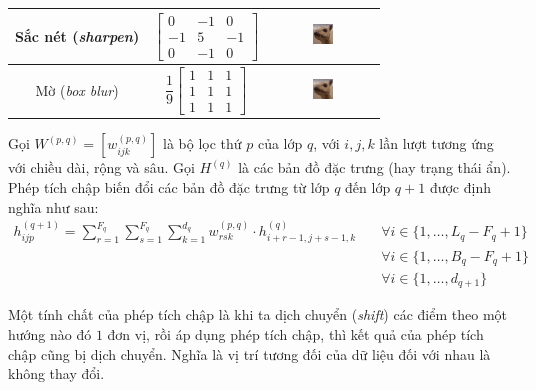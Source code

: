 \begin{table}[htbp]
\begin{tabular}{ c c c }
        Sắc nét (\textit{sharpen})   & $\begin{bmatrix}0&-1&0\\-1&5&-1\\0&-1&0\end{bmatrix}$         & \includegraphics[width=0.2\textwidth, valign=c]{image/cnn-sharp.png} \\\midrule
        Mờ (\textit{box blur})       & $\dfrac{1}{9}\begin{bmatrix}1&1&1\\1&1&1\\1&1&1\end{bmatrix}$ & \includegraphics[width=0.2\textwidth, valign=c]{image/cnn-blur.png}  \\
        \bottomrule
    \end{tabular}
\end{table}

Gọi $W^{(p,q)}=[w_{ijk}^{(p,q)}]$ là bộ lọc thứ $p$ của lớp $q$, với $i,j,k$ lần lượt tương ứng với chiều dài, rộng và sâu. Gọi $H^{(q)}$ là các bản đồ đặc trưng (hay trạng thái ẩn). Phép tích chập biến đổi các bản đồ đặc trưng từ lớp $q$ đến lớp $q+1$ được định nghĩa như sau: \cite{Aggarwal2023-zk}
\begin{align}
    h_{ijp}^{(q+1)}=\sum_{r=1}^{F_q}\sum_{s=1}^{F_q}\sum_{k=1}^{d_q} w_{rsk}^{(p,q)}\cdot h_{i+r-1,j+s-1,k}^{(q)} & \quad\forall i\in\{1,\dots,L_q-F_q+1\}           \\
                                                                                                                  & \quad\forall i\in\{1,\dots,B_q-F_q+1\} \nonumber \\
                                                                                                                  & \quad\forall i\in\{1,\dots,d_{q+1}\}   \nonumber
\end{align}

Một tính chất của phép tích chập là khi ta dịch chuyển (\textit{shift}) các điểm theo một hướng nào đó $1$ đơn vị, rồi áp dụng phép tích chập, thì kết quả của phép tích chập cũng bị dịch chuyển. Nghĩa là vị trí tương đối của dữ liệu đối với nhau là không thay đổi.

